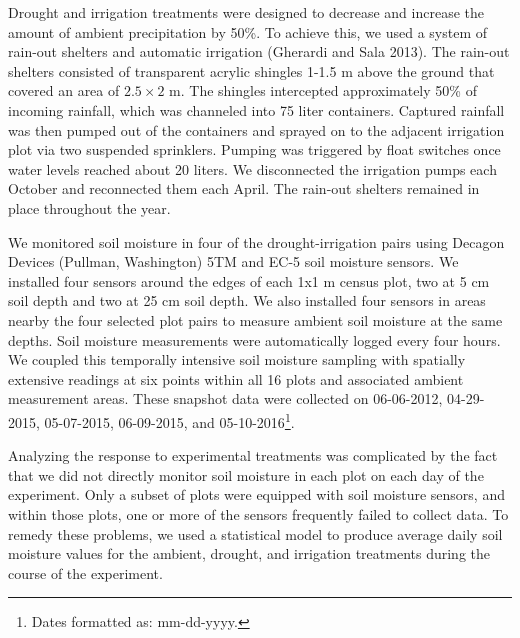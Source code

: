 \documentclass[fleqn,10pt,lineno]{wlpeerj} %
\begin{document}
Drought and irrigation treatments were designed to decrease and increase
the amount of ambient precipitation by 50\%. To achieve this, we used a
system of rain-out shelters and automatic irrigation (Gherardi and Sala
2013). The rain-out shelters consisted of transparent acrylic shingles
1-1.5 m above the ground that covered an area of \(2.5\times2\) m. The
shingles intercepted approximately 50\% of incoming rainfall, which was
channeled into 75 liter containers. Captured rainfall was then pumped
out of the containers and sprayed on to the adjacent irrigation plot via
two suspended sprinklers. Pumping was triggered by float switches once
water levels reached about 20 liters. We disconnected the irrigation
pumps each October and reconnected them each April. The rain-out
shelters remained in place throughout the year.

We monitored soil moisture in four of the drought-irrigation pairs using
Decagon Devices (Pullman, Washington) 5TM and EC-5 soil moisture
sensors. We installed four sensors around the edges of each 1x1 m census
plot, two at 5 cm soil depth and two at 25 cm soil depth. We also
installed four sensors in areas nearby the four selected plot pairs to
measure ambient soil moisture at the same depths. Soil moisture
measurements were automatically logged every four hours. We coupled this
temporally intensive soil moisture sampling with spatially extensive
readings  at six points within
all 16 plots and associated ambient measurement areas. These snapshot
data were collected on 06-06-2012, 04-29-2015, 05-07-2015, 06-09-2015,
and 05-10-2016\footnote{Dates formatted as: mm-dd-yyyy.}.

Analyzing the response to experimental treatments was complicated by the
fact that we did not directly monitor soil moisture in each plot on each
day of the experiment. Only a subset of plots were equipped with soil
moisture sensors, and within those plots, one or more of the sensors
frequently failed to collect data. To remedy these problems, we used a
statistical model to produce average daily soil moisture values for the
ambient, drought, and irrigation treatments during the course of the
experiment.
\end{document}
